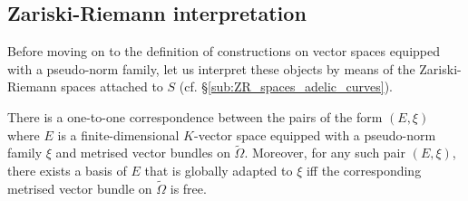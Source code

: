 \documentclass [11pt,reqno]{amsart}
\newcommand{\1}{\mathmybb{1}}
\def\tilde{\widetilde}
\begin{document}
\subsection{Zariski-Riemann interpretation}
\label{sub:ZR_interpretation_pseudo-norm_families}

Before moving on to the definition of constructions on vector spaces equipped with a pseudo-norm family, let us interpret these objects by means of the Zariski-Riemann spaces attached to $S$ (cf. \S \ref{sub:ZR_spaces_adelic_curves}). 

\begin{proposition}
\label{prop:ZR_interpretation_pseudo-norm_family}
There is a one-to-one correspondence between the pairs of the form $(E,\xi)$ where $E$ is a finite-dimensional $K$-vector space equipped with a pseudo-norm family $\xi$ and metrised vector bundles on $\tilde{\Omega}$. Moreover, for any such pair $(E,\xi)$, there exists a basis of $E$ that is globally adapted to $\xi$ iff the corresponding metrised vector bundle on $\tilde{\Omega}$ is free. 
\end{proposition}
\end{document}
